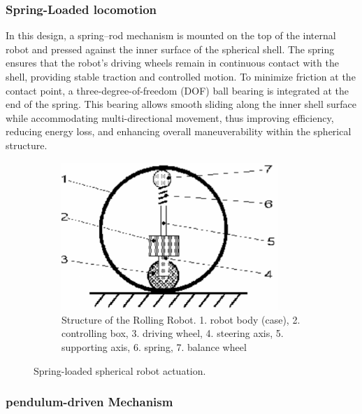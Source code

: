 \documentclass[english, bachelor, utf8]{base/thesis_telematics}
\begin{document}
\subsubsection{Spring-Loaded locomotion}
In this design, a spring–rod mechanism is mounted on the top of the internal robot and pressed against the inner surface of the spherical shell. 
The spring ensures that the robot’s driving wheels remain in continuous contact with the shell, providing stable traction and controlled motion. 
To minimize friction at the contact point, a three-degree-of-freedom (DOF) ball bearing is integrated at the end of the spring. 
This bearing allows smooth sliding along the inner shell surface while accommodating multi-directional movement, thus improving efficiency, reducing energy loss, and enhancing overall maneuverability within the spherical structure.~\cite{old_spring_paper,flywheel_hamaster_explanation,SpheriDrive}


\begin{figure}[ht]
    \centering
\begin{subfigure}{0.48\textwidth}
    \centering
    \includegraphics[width=0.9\textwidth]{pics/spring_2d.png}
    \caption{Structure of the Rolling Robot. 1. robot body (case), 2. controlling box, 3. driving wheel, 4. steering axis, 5. supporting axis, 6. spring, 7. balance wheel~\cite{old_spring_paper}}
    \label{fig:spring_2D_top}
\end{subfigure}

\caption{Spring-loaded spherical robot actuation.}
\label{fig:spring_sphere}
\end{figure}



\subsubsection{pendulum-driven Mechanism}
\end{document}
